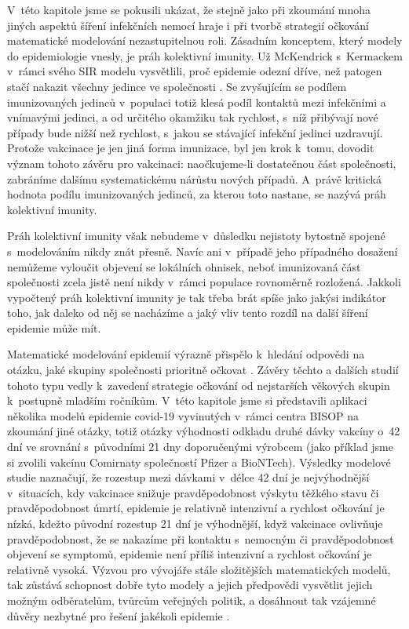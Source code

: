 V~této kapitole jsme se pokusili ukázat, že stejně jako při zkoumání mnoha jiných aspektů šíření infekčních nemocí hraje i při tvorbě strategií očkování matematické modelování nezastupitelnou roli. Zásadním konceptem, který modely do epidemiologie vnesly, je práh kolektivní imunity. Už McKendrick s~Kermackem v~rámci svého SIR modelu vysvětlili, proč epidemie odezní dříve, než patogen stačí nakazit všechny jedince ve společnosti \cite[viz také kapitola \ref{Typy_modelu}]{Bacaer2011}. Se zvyšujícím se podílem imunizovaných jedinců v~populaci totiž klesá podíl kontaktů mezi infekčními a vnímavými jedinci, a od určitého okamžiku tak rychlost, s~níž přibývají nové případy bude nižší než rychlost, s~jakou se stávající infekční jedinci uzdravují. Protože vakcinace je jen jiná forma imunizace, byl jen krok k~tomu, dovodit význam tohoto závěru pro vakcinaci: naočkujeme-li dostatečnou část společnosti, zabráníme dalšímu systematickému nárůstu nových případů. A~právě kritická hodnota podílu imunizovaných jedinců, za kterou toto nastane, se nazývá práh kolektivní imunity.

Práh kolektivní imunity však nebudeme v~důsledku nejistoty bytostně spojené s~modelováním nikdy znát přesně. Navíc ani v~případě jeho případného dosažení nemůžeme vyloučit objevení se lokálních ohnisek, neboť imunizovaná část společnosti zcela jistě není nikdy v~rámci populace rovnoměrně rozložená. Jakkoli vypočtený práh kolektivní imunity je tak třeba brát spíše jako jakýsi indikátor toho, jak daleko od něj se nacházíme a jaký vliv tento rozdíl na další šíření epidemie může mít. 

Matematické modelování epidemií výrazně přispělo k~hledání odpovědi na otázku, jaké skupiny společnosti prioritně očkovat \cite{Bubar_etal2021,Moore_etal2021b}. Závěry těchto a dalších studií tohoto typu vedly k~zavedení strategie očkování od nejstarších věkových skupin k~postupně mladším ročníkům. V~této kapitole jsme si představili aplikaci několika modelů epidemie covid-19 vyvinutých v~rámci centra BISOP na zkoumání jiné otázky, totiž otázky výhodnosti odkladu druhé dávky vakcíny o~42 dní ve srovnání s~původními 21 dny doporučenými výrobcem (jako příklad jsme si zvolili vakcínu Comirnaty společností Pfizer a BioNTech). Výsledky modelové studie naznačují, že rozestup mezi dávkami v~délce 42 dní je nejvýhodnější v~situacích, kdy vakcinace snižuje pravděpodobnost výskytu těžkého stavu či pravděpodobnost úmrtí, epidemie je relativně intenzivní a rychlost očkování je nízká, kdežto původní rozestup 21 dní je výhodnější, když vakcinace ovlivňuje pravděpodobnost, že se nakazíme při kontaktu s~nemocným či pravděpodobnost objevení se symptomů, epidemie není příliš intenzivní a rychlost očkování je relativně vysoká. Výzvou pro vývojáře stále složitějších matematických modelů, tak zůstává schopnost dobře tyto modely a jejich předpovědi vysvětlit jejich možným odběratelům, tvůrcům veřejných politik, a dosáhnout tak vzájemné důvěry nezbytné pro řešení jakékoli epidemie \cite{BasuAndrews2013}.